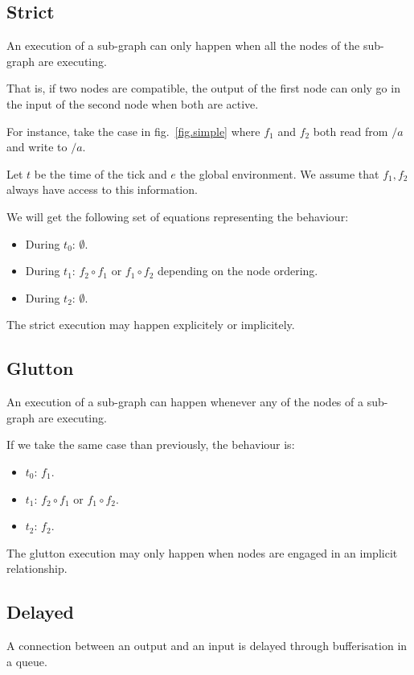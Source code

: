 \documentclass{article}
\begin{document}
    \subsection{Strict}
    An execution of a sub-graph can only happen when all the nodes of the sub-graph are executing.
    
    That is, if two nodes are compatible, the output of the first node can only go in the input of the second node when both are active.
    
    For instance, take the case in fig.~\ref{fig.simple} where $f_1$ and $f_2$ both read from $/a$ and write to $/a$.
    
    Let $t$ be the time of the tick and $e$ the global environment. 
    We assume that $f_1, f_2$ always have access to this information.
    
    We will get the following set of equations representing the behaviour: 
    \begin{itemize}
        \item During $t_0$: $\emptyset$.
        \item During $t_1$: $f_2 \circ f_1 $ or $f_1 \circ f_2$ depending on the node ordering.
        \item During $t_2$: $\emptyset$. 
    \end{itemize}

    The strict execution may happen explicitely or implicitely.
    
	\subsection{Glutton}
	An execution of a sub-graph can happen whenever any of the nodes of a sub-graph are executing. 
    
    If we take the same case than previously, the behaviour is:
    \begin{itemize}
        \item $t_0$: $f_1$.
        \item $t_1$: $f_2 \circ f_1$ or $f_1 \circ f_2$.
        \item $t_2$: $f_2$. 
    \end{itemize}

    The glutton execution may only happen when nodes are engaged in an implicit relationship.
    
	\subsection{Delayed}
	A connection between an output and an input is delayed through bufferisation in a queue.
	
\end{document}
